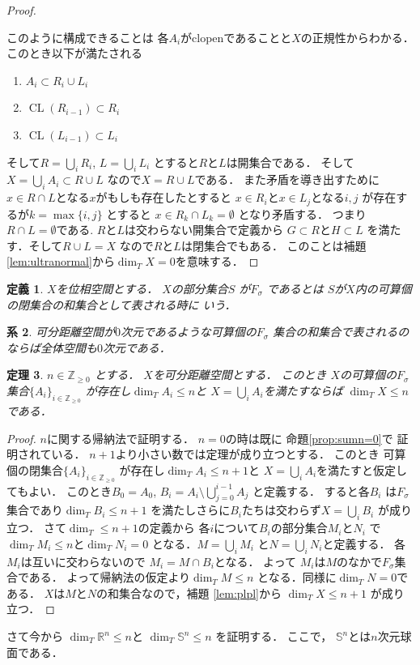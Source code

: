 \documentclass[leqno, a4paper, 12pt]{jsarticle}
\newtheorem{thm}{定理}
\newtheorem{cor}[thm]{系}
\newtheorem{df}[thm]{定義}
\newcommand{\zz}{\mathbb{Z}}
\newcommand{\rr}{\mathbb{R}}
\DeclareMathOperator{\cl}{CL}
\numberwithin{equation}{section}
\begin{document}
\begin{proof}
\begin{enumerate}
\end{enumerate}
このように構成できることは
各$A_{i}$がclopenであることと$X$の正規性からわかる．
このとき以下が満たされる
\begin{enumerate}
\item $A_{i}\subset R_{i}\cup L_{i}$
\item 
$\cl(R_{i-1})\subset R_{i}$

\item 
$\cl(L_{i-1})\subset L_{i}$
\end{enumerate}
そして$R=\bigcup_{i}R_{i}$, 
$L=\bigcup_{i}L_{i}$
とすると$R$と$L$は開集合である．
そして
$X=\bigcup_{i}A_{i}\subset R\cup L$
なので$X=R\cup L$である．
また矛盾を導き出すために$x\in R\cap L$となる$x$がもしも存在したとすると
$x\in R_{i}$と$x\in L_{j}$となる$i, j$
が存在するが$k=\max\{i, j\}$
とすると
$x\in R_{k}\cap L_{k}=\emptyset$
となり矛盾する．
つまり$R\cap L=\emptyset$である. 
$R$と$L$は交わらない開集合で定義から
$G\subset R$と$H\subset L$
を満たす．そして$R\cup L=X$
なので$R$と$L$は閉集合でもある．
このことは補題 \ref{lem:ultranormal}から$\dim_{T}X=0$を意味する．
\end{proof}


\begin{df}
$X$を位相空間とする．
$X$の部分集合$S$
が$F_{\sigma}$
であるとは
$S$が$X$内の可算個の閉集合の和集合として表される時に
いう．
\end{df}

\begin{cor}
可分距離空間が$0$次元であるような可算個の$F_{\sigma}$
集合の和集合で表されるのならば全体空間も$0$次元である．
\end{cor}


\begin{thm}\label{thm:sumsum}
$n\in \zz_{\ge 0}$
とする．
$X$を可分距離空間とする．
このとき
$X$の可算個の$F_{\sigma}$集合$\{A_{i}\}_{i\in \zz_{\ge 0}}$
が存在し$\dim_{T}A_{i}\le n$と
$X=\bigcup_{i}A_{i}$を満たすならば
$\dim_{T}X\le n$である．
\end{thm}
\begin{proof}
$n$に関する帰納法で証明する．
$n=0$の時は既に
命題\ref{prop:sumn=0}で
証明されている．
$n+1$より小さい数では定理が成り立つとする．
このとき
可算個の閉集合$\{A_{i}\}_{i\in \zz_{\ge 0}}$
が存在し$\dim_{T}A_{i}\le n+1$と
$X=\bigcup_{i}A_{i}$を満たすと仮定してもよい．
このとき$B_{0}=A_{0}$, 
$B_{i}=A_{i}\setminus \bigcup_{j=0}^{i-1}A_{j}$
と定義する．
すると各$B_{i}$
は$F_{\sigma}$集合であり$\dim_{T}B_{i}\le n+1$
を満たしさらに$B_{i}$たちは交わらず$X=\bigcup_{i}B_{i}$
が成り立つ．
さて$\dim_{T}\le n+1$の定義から
各$i$について$B_{i}$の部分集合$M_{i}$と$N_{i}$
で$\dim_{T}M_{i}\le n$と$\dim_{T}N_{i}=0$
となる．$M=\bigcup_{i}M_{i}$
と$N=\bigcup_{i}N_{i}$と定義する．
各$M_{i}$は互いに交わらないので
$M_{i}=M\cap B_{i}$となる．
よって
$M_{i}$は$M$のなかで$F_{\sigma}$集合である．
よって帰納法の仮定より$\dim_{T}M\le n$
となる．同様に$\dim_{T}N=0$である．
$X$は$M$と$N$の和集合なので，補題 \ref{lem:plpl}から
$\dim_{T}X\le n+1$
が成り立つ．
\end{proof}
さて今から
$\dim_{T}\rr^{n}\le n$と
$\dim_{T}\mathbb{S}^{n}\le n$
を証明する．
ここで，
$\mathbb{S}^{n}$とは$n$次元球面である．
\end{document}
